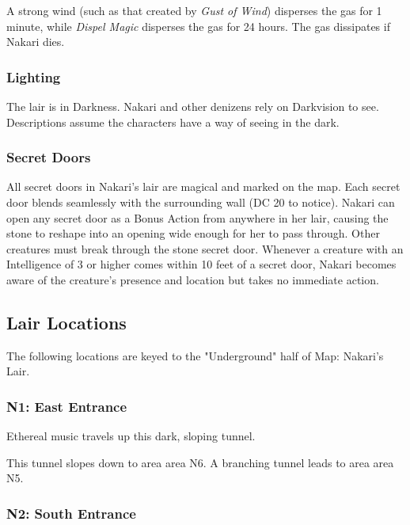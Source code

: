\documentclass[letterpaper, 11pt, twocolumn]{dndbook}
\begin{document}
A strong wind (such as that created by \textit{Gust of Wind}) disperses the gas for 1 minute, while \textit{Dispel Magic} disperses the gas for 24 hours. The gas dissipates if Nakari dies.

\subsubsection{Lighting}

The lair is in Darkness. Nakari and other denizens rely on Darkvision to see. Descriptions assume the characters have a way of seeing in the dark.

\subsubsection{Secret Doors}

All secret doors in Nakari's lair are magical and marked on the map. Each secret door blends seamlessly with the surrounding wall (DC 20 to notice). Nakari can open any secret door as a Bonus Action from anywhere in her lair, causing the stone to reshape into an opening wide enough for her to pass through. Other creatures must break through the stone secret door. Whenever a creature with an Intelligence of 3 or higher comes within 10 feet of a secret door, Nakari becomes aware of the creature's presence and location but takes no immediate action.

\subsection{Lair Locations}



The following locations are keyed to the "Underground" half of Map: Nakari's Lair.

\subsubsection{N1: East Entrance}

\begin{DndReadAloud}
Ethereal music travels up this dark, sloping tunnel.
\end{DndReadAloud}

This tunnel slopes down to area area N6. A branching tunnel leads to area area N5.

\subsubsection{N2: South Entrance}
\end{document}
